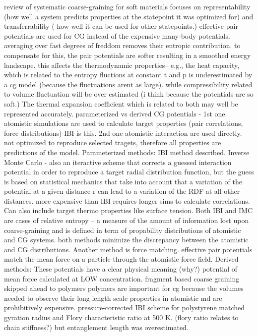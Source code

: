 \documentclass{article}
\begin{document}
\cite{Brini2013}

review of systematic coarse-graining for soft materials
focuses on representability (how well a system predicts properties at the statepoint it was optimized for) and transferrability ( how well it can be used for other statepoints.)
effective pair potentials are used for CG instead of the expensive many-body potentials. averaging over fast degrees of freddom removes their entropic contribution. to compensate for this, the pair potentials are softer resulting in a smoothed energy landscape. this affects the thermodynamic properties-- e.g., the heat capacity, which is related to the entropy fluctions at constant t and p is underestimated by a cg model (because the fluctuations arent as large). while compressibility related to volume fluctuation will be over estimated (i think because the potentials are so soft.) The thermal expansion coefficient which is related to both may well be represented accurately.
parameterized vs derived CG potentials - 1st one atomistic simulations are used to calculate target properties (pair correlations, force distributions) IBI is this. 2nd one atomistic interaction are used directly. not optimized to reproduce selected tragets, therefore all properties are predictions of the model.
Parameterized methods: IBI method described. 
Inverse Monte Carlo - also an iteractive scheme that corrects a guessed interaction potential in order to reproduce a target radial distribution function, but the guess is based on statistical mechanics that take into account that a variation of the potential at a given distance r can lead to a variation of the RDF at all other distances. more expensive than IBI requires longer sims to calculate correlations. Can also include target thermo properties like surface tension.
Both IBI and IMC are cases of relative entropy -- a measure of the amount of information lost upon coarse-graining and is defined in term of propability distributions of atomistic and CG systems. both methods minimize the discrepancy between the atomistic and CG distributions.
Another method is force matching. effective pair potentials match the mean force on a particle through the atomistic force field.
Derived methods: These potentials have a clear physical meaning (why?) potential of mean force calculated at LOW concentration. fragment based coarse graining
skipped ahead to polymers
polymers are important for cg because the volumes needed to observe their long length scale properties in atomistic md are prohibitively expensive. pressure-corrected IBI scheme for polystyrene matched gyration radius and Flory characteristic ratio at 500 K. (flory ratio relates to chain stiffness?) but entanglement length was overestimated.
\end{document}

